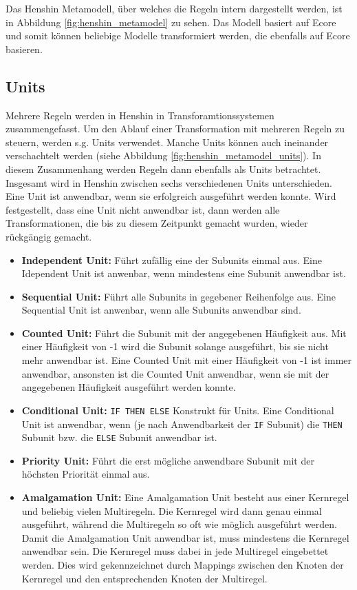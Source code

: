 Das Henshin Metamodell, über welches die Regeln intern dargestellt werden, ist in Abbildung
\ref{fig:henshin_metamodel} zu sehen. Das Modell basiert auf Ecore und somit können beliebige
Modelle transformiert werden, die ebenfalls auf Ecore basieren.

\subsection{Units}

Mehrere Regeln werden in Henshin in Transforamtionssystemen zusammengefasst. Um den Ablauf einer
Transformation mit mehreren Regeln zu steuern, werden s.g. Units verwendet. Manche Units können auch
ineinander verschachtelt werden (siehe Abbildung \ref{fig:henshin_metamodel_units}). In diesem
Zusammenhang werden Regeln dann ebenfalls als Units betrachtet. Insgesamt wird in Henshin zwischen
sechs verschiedenen Units unterschieden. Eine Unit ist anwendbar, wenn sie erfolgreich ausgeführt
werden konnte. Wird festgestellt, dass eine Unit nicht anwendbar ist, dann werden alle
Transformationen, die bis zu diesem Zeitpunkt gemacht wurden, wieder rückgängig gemacht.

\begin{itemize}
  \item \textbf{Independent Unit:} Führt zufällig eine der Subunits einmal aus. Eine Idependent Unit
  ist anwenbar, wenn mindestens eine Subunit anwendbar ist.
  
  \item \textbf{Sequential Unit:} Führt alle Subunits in gegebener Reihenfolge aus. Eine Sequential
  Unit ist anwenbar, wenn alle Subunits anwendbar sind.
  
  \item \textbf{Counted Unit:} Führt die Subunit mit der angegebenen Häufigkeit aus. Mit einer
  Häufigkeit von -1 wird die Subunit solange ausgeführt, bis sie nicht mehr anwendbar ist. Eine
  Counted Unit mit einer Häufigkeit von -1 ist immer anwendbar, ansonsten ist die Counted Unit
  anwendbar, wenn sie mit der angegebenen Häufigkeit ausgeführt werden konnte.
  
  \item \textbf{Conditional Unit:} \texttt{IF THEN ELSE} Konstrukt für Units. Eine Conditional Unit
  ist anwendbar, wenn (je nach Anwendbarkeit der \texttt{IF} Subunit) die \texttt{THEN} Subunit bzw.
  die \texttt{ELSE} Subunit anwendbar ist.
 
  \item \textbf{Priority Unit:} Führt die erst mögliche anwendbare Subunit mit der höchsten Priorität
  einmal aus.
  
  \item \textbf{Amalgamation Unit:} Eine Amalgamation Unit besteht aus einer Kernregel und beliebig
  vielen Multiregeln. Die Kernregel wird dann genau einmal ausgeführt, während die Multiregeln
  so oft wie möglich ausgeführt werden. Damit die Amalgamation Unit anwendbar ist, muss mindestens
  die Kernregel anwendbar sein. Die Kernregel muss dabei in jede Multiregel eingebettet werden. Dies
  wird gekennzeichnet durch Mappings zwischen den Knoten der Kernregel und den entsprechenden
  Knoten der Multiregel.
\end{itemize}


